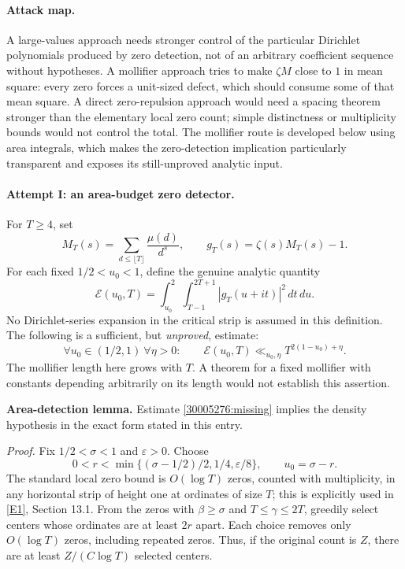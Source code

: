 \documentclass[11pt,a4paper]{article}
\newcommand{\eref}[2]{\hyperlink{extra:#1:#2}{[E#2]}}
\numberwithin{equation}{section}
\begin{document}
\paragraph{Attack map.}
A large-values approach needs stronger control of the particular
Dirichlet polynomials produced by zero detection, not of an arbitrary
coefficient sequence without hypotheses.  A mollifier approach tries
to make $\zeta M$ close to $1$ in mean square: every zero forces a
unit-sized defect, which should consume some of that mean square.
A direct zero-repulsion approach would need a spacing theorem stronger
than the elementary local zero count; simple distinctness or multiplicity
bounds would not control the total.  The mollifier route is developed
below using area integrals, which makes the zero-detection implication
particularly transparent and exposes its still-unproved analytic input.

\paragraph{Attempt I: an area-budget zero detector.}
For $T\geq4$, set
\[
 M_T(s)=\sum_{d\leq\lfloor T\rfloor}\frac{\mu(d)}{d^s},\qquad
 g_T(s)=\zeta(s)M_T(s)-1.
\]
For each fixed $1/2<u_0<1$, define the genuine analytic quantity
\begin{equation}\label{30005276:area}
 \mathcal E(u_0,T)=\int_{u_0}^{2}\int_{T-1}^{2T+1}
                       |g_T(u+it)|^2\,dt\,du.
\end{equation}
No Dirichlet-series expansion in the critical strip is assumed in this
definition.  The following is a sufficient, but \emph{unproved}, estimate:
\begin{equation}\label{30005276:missing}
 \forall u_0\in(1/2,1)\ \forall\eta>0:\qquad
 \mathcal E(u_0,T)\ll_{u_0,\eta}T^{2(1-u_0)+\eta}.
\end{equation}
The mollifier length here grows with $T$.  A theorem for a fixed
mollifier with constants depending arbitrarily on its length would not
establish this assertion.

\textbf{Area-detection lemma.}
Estimate \eqref{30005276:missing} implies the density hypothesis in the exact
form stated in this entry.

\emph{Proof.} Fix $1/2<\sigma<1$ and $\varepsilon>0$.  Choose
\[
 0<r<\min\{(\sigma-1/2)/2,1/4,\varepsilon/8\},\qquad u_0=\sigma-r.
\]
The standard local zero bound is $O(\log T)$ zeros, counted with
multiplicity, in any horizontal strip of height one at ordinates of
size $T$; this is explicitly used in \eref{30005276}{1}, Section 13.1.
From the zeros with $\beta\geq\sigma$ and $T\leq\gamma\leq2T$,
greedily select centers whose ordinates are at least $2r$ apart.
Each choice removes only $O(\log T)$ zeros, including repeated zeros.
Thus, if the original count is $Z$, there are at least
$Z/(C\log T)$ selected centers.
\end{document}
